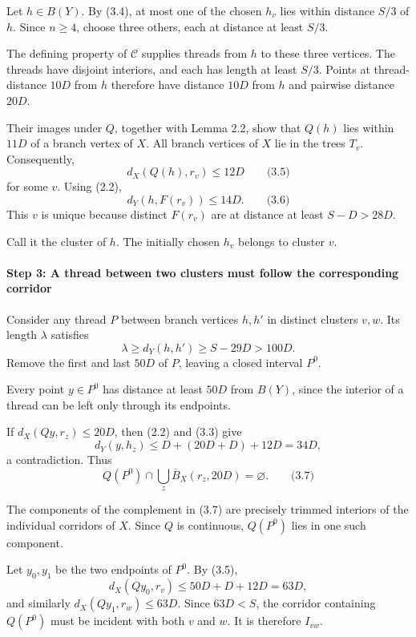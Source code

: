 \documentclass[
  11pt,
  a4paper,
]{article}
\begin{document}
Let \(h\in B(Y)\). By (3.4), at most one of the chosen \(h_v\) lies
within distance \(S/3\) of \(h\). Since \(n\ge4\), choose three others,
each at distance at least \(S/3\).

The defining property of \(\mathcal C\) supplies threads from \(h\) to
these three vertices. The threads have disjoint interiors, and each has
length at least \(S/3\). Points at thread-distance \(10D\) from \(h\)
therefore have distance \(10D\) from \(h\) and pairwise distance
\(20D\).

Their images under \(Q\), together with Lemma 2.2, show that \(Q(h)\)
lies within \(11D\) of a branch vertex of \(X\). All branch vertices of
\(X\) lie in the trees \(T_v\). Consequently, \[
d_X(Q(h),r_v)\le12D
\qquad\text{(3.5)}
\] for some \(v\). Using (2.2), \[
d_Y(h,F(r_v))\le14D.
\qquad\text{(3.6)}
\] This \(v\) is unique because distinct \(F(r_v)\) are at distance at
least \(S-D>28D\).

Call it the cluster of \(h\). The initially chosen \(h_v\) belongs to
cluster \(v\).

\paragraph{Step 3: A thread between two clusters must follow the
corresponding
corridor}\label{step-3-a-thread-between-two-clusters-must-follow-the-corresponding-corridor}

Consider any thread \(P\) between branch vertices \(h,h'\) in distinct
clusters \(v,w\). Its length \(\lambda\) satisfies \[
\lambda\ge d_Y(h,h')\ge S-29D>100D.
\] Remove the first and last \(50D\) of \(P\), leaving a closed interval
\(P^0\).

Every point \(y\in P^0\) has distance at least \(50D\) from \(B(Y)\),
since the interior of a thread can be left only through its endpoints.

If \(d_X(Qy,r_z)\le20D\), then (2.2) and (3.3) give \[
d_Y(y,h_z)
 \le D+(20D+D)+12D
 =34D,
\] a contradiction. Thus \[
Q(P^0)\cap\bigcup_z\overline B_X(r_z,20D)=\varnothing.
\qquad\text{(3.7)}
\]

The components of the complement in (3.7) are precisely trimmed
interiors of the individual corridors of \(X\). Since \(Q\) is
continuous, \(Q(P^0)\) lies in one such component.

Let \(y_0,y_1\) be the two endpoints of \(P^0\). By (3.5), \[
d_X(Qy_0,r_v)\le 50D+D+12D=63D,
\] and similarly \(d_X(Qy_1,r_w)\le63D\). Since \(63D<S\), the corridor
containing \(Q(P^0)\) must be incident with both \(v\) and \(w\). It is
therefore \(I_{vw}\).
\end{document}
